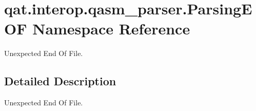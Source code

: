 \hypertarget{namespaceqat_1_1interop_1_1qasm__parser_1_1ParsingEOF}{\section{qat.\-interop.\-qasm\-\_\-parser.\-Parsing\-E\-O\-F Namespace Reference}
\label{namespaceqat_1_1interop_1_1qasm__parser_1_1ParsingEOF}
}


Unexpected End Of File.  




\subsection{Detailed Description}
Unexpected End Of File. 